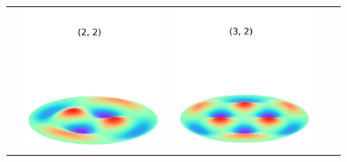 \documentclass[a4paper]{ctexart}
\begin{document}
\begin{figure}[htbp]
\begin{tabular}{ccccc}
			& \includegraphics[scale=0.4]{2_2.png} & \includegraphics[scale=0.4]{3_2.png}

\end{tabular}
\end{figure}
\end{document}
